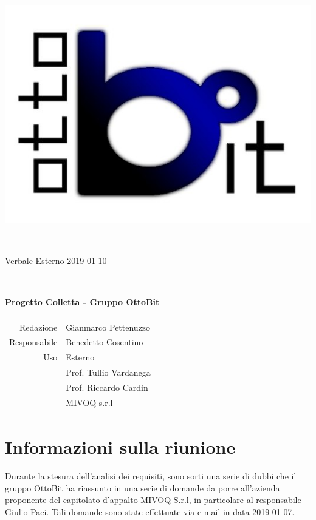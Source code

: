 \documentclass[11pt,a4paper]{article}
\begin{document}
	\begin{titlepage}
  \centering
	\scshape
	
	\vspace*{2cm}
	\includegraphics[scale=0.7]{../images/logo.png}
	\rule{\linewidth}{0.2mm}\\[0.37cm]
	{\Huge Verbale Esterno 2019-01-10}\\
	\rule{\linewidth}{0.2mm}\\[1cm]
	{\LARGE\bfseries Progetto Colletta - Gruppo OttoBit}\\[1cm]
	
	
	
	\begin{tabular}{>{\columncolor{Gray}}r | >{\normalfont}l}
		\rowcolor{LightBlue}		
		\multicolumn{2}{c}{\color{white}{Informazioni sul documento}}\\
		Redazione & Gianmarco Pettenuzzo\\
 		Responsabile & Benedetto Cosentino\\
 		Uso & Esterno\\
 																 		& Prof. Tullio Vardanega\\
 																		& Prof. Riccardo Cardin\\
 		\multirow[t]{-3}{*}{Destinatari}	& MIVOQ s.r.l\\
 		\hline
	\end{tabular}
\end{titlepage}

	\tableofcontents
	\newpage	
	
	\section{Informazioni sulla riunione}
	Durante la stesura dell’analisi dei requisiti, sono sorti una serie di dubbi che il gruppo OttoBit ha riassunto in una serie di domande da porre all'azienda proponente del capitolato d'appalto MIVOQ S.r.l, in particolare al responsabile Giulio Paci.
	Tali domande sono state effettuate via e-mail in data 2019-01-07.
	
\end{document}
